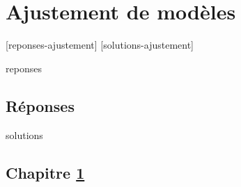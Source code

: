\chapter{Ajustement de modèles}
\label{chap:ajustement}

[reponses-ajustement]
[solutions-ajustement]

\begin{Filesave}{reponses}
\bigskip
\section*{Réponses}

\end{Filesave}

\begin{Filesave}{solutions}
\section*{Chapitre \ref{chap:ajustement}}

\end{Filesave}







